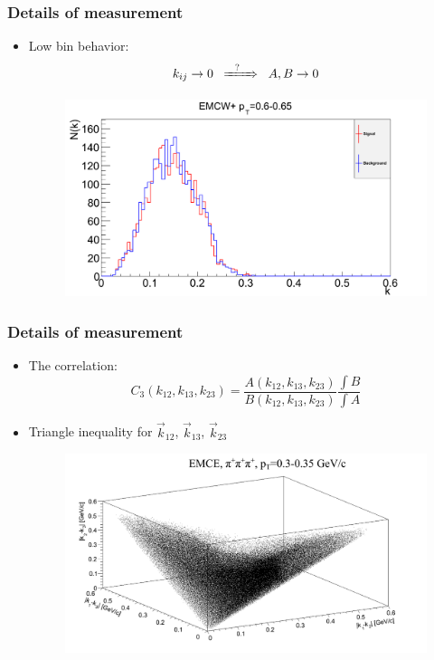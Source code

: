 \documentclass{beamer}
\begin{document}
\begin{frame}
\frametitle{Details of measurement}
\begin{itemize}
\setlength{\itemsep}{16pt}
\item Low bin behavior:
\begin{equation}
k_{ij}\rightarrow 0 \;\;\xRightarrow{\;\;\;?\;\;\;\;}\;\; A,B\rightarrow 0
\end{equation}
\begin{figure}
\includegraphics[scale=0.25]{pic/AB}
\end{figure}
\end{itemize}
\end{frame}

\begin{frame}
\frametitle{Details of measurement}
\begin{itemize}
\setlength{\itemsep}{16pt}
\item The correlation:
\begin{equation}
C_3(k_{12}, k_{13}, k_{23})=\frac{A(k_{12}, k_{13}, k_{23})}{B(k_{12}, k_{13}, k_{23})}\frac{\int B}{\int A}
\end{equation}
\item Triangle inequality for $\vec{k}_{12}$, $\vec{k}_{13}$, $\vec{k}_{23}$
\begin{figure}
\includegraphics[scale=0.25]{pic/C1}
\end{figure}
\end{itemize}
\end{frame}
\end{document}
